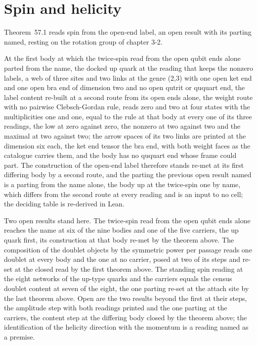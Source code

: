 \section{Spin and helicity}\label{mod:III-5-spin-and-helicity}
\label{narr:open:3-5}Theorem~57.1 reads spin from the open-end label, an open result with its parting named, resting on the rotation group of chapter 3-2.
\begin{chtheorem}\label{box:III-5-spin-and-helicity:1}
At the first body at which the twice-spin read from the open qubit ends alone parted from the name, the docked up quark at the reading that keeps the nonzero labels, a web of three sites and two links at the genre (2,3) with one open ket end and one open bra end of dimension two and no open qutrit or ququart end, the label content re-built at a second route from its open ends alone, the weight route with no pairwise Clebsch-Gordan rule, reads zero and two at four states with the multiplicities one and one, equal to the rule at that body at every one of its three readings, the low at zero against zero, the nonzero at two against two and the maximal at two against two; the arrow spaces of its two links are printed at the dimension six each, the ket end tensor the bra end, with both weight faces as the catalogue carries them, and the body has no ququart end whose frame could part. The construction of the open-end label therefore stands re-met at its first differing body by a second route, and the parting the previous open result named is a parting from the name alone, the body up at the twice-spin one by name, which differs from the second route at every reading and is an input to no cell; the deciding table is re-derived in Lean.
\end{chtheorem}
\begin{chwall}\label{box:III-5-spin-and-helicity:2}
Two open results stand here. The twice-spin read from the open qubit ends alone reaches the name at six of the nine bodies and one of the five carriers, the up quark first, its construction at that body re-met by the theorem above. The composition of the doublet objects by the symmetric power per passage reads one doublet at every body and the one at no carrier, posed at two of its steps and re-set at the closed read by the first theorem above. The standing spin reading at the eight networks of the up-type quarks and the carriers equals the census doublet content at seven of the eight, the one parting re-set at the attach site by the last theorem above.
Open are the two results beyond the first at their steps, the amplitude step with both readings printed and the one parting at the carriers, the content step at the differing body closed by the theorem above; the identification of the helicity direction with the momentum is a reading named as a premise.
\end{chwall}
